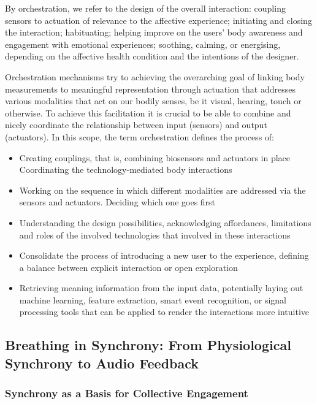 By orchestration, we refer to the design of the overall interaction: coupling sensors to actuation of relevance to the affective experience; initiating and closing the interaction; habituating; helping improve on the users' body awareness and engagement with emotional experiences; soothing, calming, or energising, depending on the affective health condition and the intentions of the designer.

Orchestration mechanisms try to achieving the overarching goal of linking body measurements to meaningful representation through actuation that addresses various modalities that act on our bodily senses, be it visual, hearing, touch or otherwise. To achieve this facilitation it is crucial to be able to combine and nicely coordinate the relationship between input (sensors) and output (actuators). In this scope, the term orchestration defines the process of:
\begin{itemize}
    \item Creating couplings, that is, combining biosensors and actuators in place
    Coordinating the technology-mediated body interactions
    \item Working on the sequence in which different modalities are addressed via the sensors and actuators. Deciding which one goes first
    \item Understanding the design possibilities, acknowledging affordances, limitations and roles of the involved technologies that involved in these interactions
    \item Consolidate the process of introducing a new user to the experience, defining a balance between explicit interaction or open exploration
    \item Retrieving meaning information from the input data, potentially laying out machine learning, feature extraction, smart event recognition, or signal processing tools that can be applied to render the interactions more intuitive
\end{itemize}

\subsection{Breathing in Synchrony: From Physiological Synchrony to Audio Feedback}

\subsubsection{Synchrony as a Basis for Collective Engagement}

